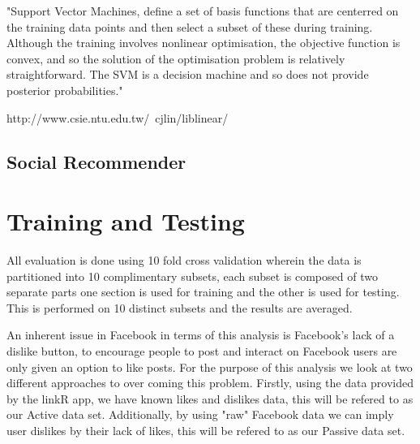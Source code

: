 "Support Vector Machines, define a set of basis functions that are centerred on the training data points and then select a subset of these 
during training. Although the training involves nonlinear optimisation, the objective function is convex, and so the solution of the optimisation 
problem is relatively straightforward. The SVM is a decision machine and so does not provide posterior probabilities."

http://www.csie.ntu.edu.tw/~cjlin/liblinear/

\subsection{Social Recommender}
\label{sec:sr}

\section{Training and Testing}
\label{sec:tt}

All evaluation is done using 10 fold cross validation wherein the data is partitioned into 10 complimentary subsets, each subset is composed of 
two separate parts one section is used for training and the other is used for testing. 
This is performed on 10 distinct subsets and the results are averaged.

An inherent issue in Facebook in terms of this analysis is Facebook's lack of a dislike button, to encourage people to post and interact on Facebook 
users are only given an option to like posts. For the purpose of this analysis we look at two different approaches to over coming this problem. Firstly, 
using the data provided by the linkR app, we have known likes and dislikes data, this will be refered to as our Active data set. Additionally, by using 
"raw" Facebook data we can imply user dislikes by their lack of likes, this will be refered to as our Passive data set.

